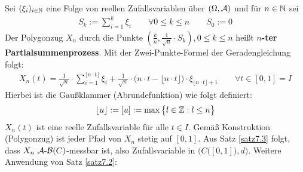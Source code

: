 \begin{beispiel}
Sei $(\xi_i)_{i\in\mathbb{N}}$ eine Folge von reellen Zufallsvariablen über $(\Omega,\mathcal{A})$ und für $n\in\mathbb{N}$ sei
\begin{align*}
S_k:=\sum\limits_{i=1}^k\xi_i\qquad\forall0\leq k\leq n\qquad S_0:=0
\end{align*}
Der Polygonzug $X_n$ durch die Punkte $\left(\frac{k}{n},\frac{1}{\sqrt{n}}\cdot S_k\right),0\leq k\leq n$ heißt \textbf{$n$-ter Partialsummenprozess}.
Mit der Zwei-Punkte-Formel der Geradengleichung folgt:
\begin{align*}
X_n(t)=\frac{1}{\sqrt{n}}\cdot\sum\limits_{i=1}^{\lfloor n\cdot t\rfloor}\xi_i+\frac{1}{\sqrt{n}}\cdot\big(n\cdot t-\lfloor n\cdot t\rfloor\big)\cdot\xi_{\lfloor n\cdot t\rfloor+1}\qquad\forall t\in[0,1]=I
\end{align*}
Hierbei ist die Gaußklammer (Abrundefunktion) wie folgt definiert:
\begin{align*}
\lfloor u\rfloor:=[u]:=\max\big\lbrace l\in\mathbb{Z}:l\leq n\big\rbrace
\end{align*}
$X_n(t)$ ist eine reelle Zufallsvariable für alle $t\in I$. Gemäß Konstruktion (Polygonzug) ist jeder Pfad von $X_n$ stetig auf $[0,1]$. Aus Satz \ref{satz7.3} folgt, dass $X_n~\mathcal{A}\text{-}\mathcal{B}(C)$-messbar ist, also Zufallsvariable in $\Big(C\big([0,1]\big),d\Big)$. Weitere Anwendung von Satz \ref{satz7.2}:
\end{beispiel}

